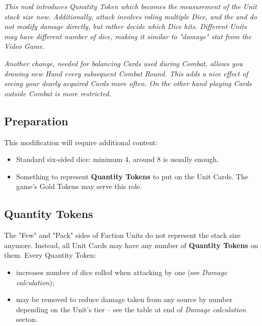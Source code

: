 
\textit{This mod introduces Qunatity Token which becomes the measurement of the Unit stack size now. Additionally, attack involves roling multiple Dice, and the  and  do not modify damage directly, but rather decide which Dice hits. Different Units may have different number of dice, making it similar to "damage" stat from the Video Game.}

\textit{Another change, needed for balancing Cards used during Combat, allows you drawing new Hand every subsequent Combat Round. This adds a nice effect of seeing your dearly acquired Cards more often. On the other hand playing Cards outside Combat is more restricted.}

\begin{multicols*}{2}
    \subsection*{Preparation}
    
    This modification will require additional content:
    \begin{itemize}
        \item Standard six-sided dice: minimum 4, around 8 is usually enough.
        \item Something to represent \textbf{Quantity Tokens} to put on the Unit Cards. The game's Gold Tokens may serve this role.
    \end{itemize}
    
    \subsection*{Quantity Tokens}
    
    The "Few" and "Pack" sides of Faction Units do not represent the stack size anymore. Instead, all Unit Cards may have any number of \textbf{Quantity Tokens} on them. Every Quantity Token:
    \begin{itemize}
        \item increases number of dice rolled when attacking by one (see \textit{Damage calculation});
        \item may be removed to reduce damage taken from any source by number depending on the Unit's tier -- see the table at end of \textit{Damage calculation} secton.
    \end{itemize} 
    
    \medskip
    

\end{multicols*}
